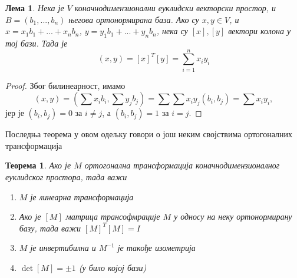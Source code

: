 \documentclass{report}
\theoremstyle{plain}
\newtheorem{thm}{Теорема}
\newtheorem*{lem}{Лема}
\theoremstyle{definition}
\begin{document}
\begin{lem}
  Нека је $V$ коначнодимензионални еуклидски векторски простор, и $B = (b_1, ..., b_n)$ његова ортонормирана база. Ако су $x, y \in V$, и $x = x_1b_1+...+x_nb_n$, $y = y_1b_1+...+y_nb_n$, нека су $[x], [y]$ вектори колона у тој бази. Тада је $$(x, y) = [x]^T [y] = \sum_{i=1}^{n} x_iy_i$$
\end{lem}
\begin{proof}
    Због билинеарност, имамо
    $$(x, y) = (\sum x_ib_i, \sum y_j b_j) = \sum \sum x_iy_j(b_i, b_j) = \sum x_iy_i, $$
    јер је $(b_i, b_j) = 0$ за $i\neq j$, а $(b_i, b_j) = 1$ за $i=j$.
\end{proof}

Последња теорема у овом одељку говори о још неким својствима ортогоналних трансформација
\begin{thm}
Ако је $M$ ортогонална трансформација коначнодимензионалног еуклидског простора, тада важи
\begin{enumerate}
  \item $M$ је линеарна трансформација
  \item Ако је $[M]$ матрица трансофмрације $M$ у односу на неку ортонормирану базу, тада важи $[M]^T[M] = I$
  \item $M$ је инвертибилна и $M^{-1}$ је такође изометрија
  \item $\det [M]=\pm 1$ (у било којој бази)
\end{enumerate}
\end{thm}
\end{document}
